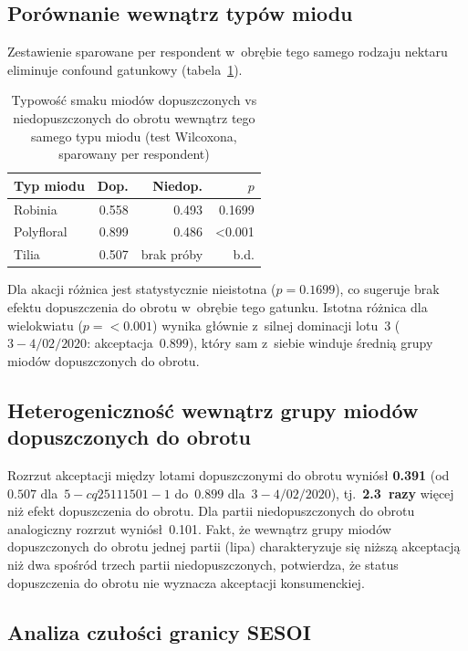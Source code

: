 \subsection{Porównanie wewnątrz typów miodu}

Zestawienie sparowane per respondent w~obrębie tego samego rodzaju nektaru
eliminuje confound gatunkowy (tabela~\ref{tab:within}).

\begin{table}[h]
\centering
\caption{Typowość smaku miodów dopuszczonych vs niedopuszczonych do obrotu
         wewnątrz tego samego typu miodu
         (test Wilcoxona, sparowany per respondent)}
\label{tab:within}
\begin{tabular}{lrrr}
\toprule
Typ miodu  & Dop.        & Niedop.          & $p$ \\
\midrule
Robinia    & 0.558  & 0.493  & 0.1699 \\
Polyfloral & 0.899 & 0.486 & <0.001 \\
Tilia      & 0.507     & brak próby          & b.d. \\
\bottomrule
\end{tabular}
\end{table}

Dla akacji różnica jest statystycznie nieistotna ($p = 0.1699$), co
sugeruje brak efektu dopuszczenia do obrotu w~obrębie tego gatunku.
Istotna różnica dla wielokwiatu ($p = <0.001$) wynika głównie z~silnej
dominacji lotu~3 ($3-4/02/2020$: akceptacja~$0.899$),
który sam z~siebie winduje średnią grupy miodów dopuszczonych do obrotu.

\subsection{Heterogeniczność wewnątrz grupy miodów dopuszczonych do obrotu}

Rozrzut akceptacji między lotami dopuszczonymi do obrotu wyniósł
\textbf{0.391} (od~$0.507$ dla~$5-cq25111501-1$
do~$0.899$ dla~$3-4/02/2020$), tj.\
\textbf{2.3~razy} więcej niż efekt dopuszczenia do obrotu.
Dla partii niedopuszczonych do obrotu analogiczny rozrzut wyniósł~0.101.
Fakt, że wewnątrz grupy miodów dopuszczonych do obrotu jednej partii (lipa) charakteryzuje się
niższą akceptacją niż dwa spośród trzech partii niedopuszczonych,
potwierdza, że status dopuszczenia do obrotu nie wyznacza akceptacji konsumenckiej.

\subsection{Analiza czułości granicy SESOI}

